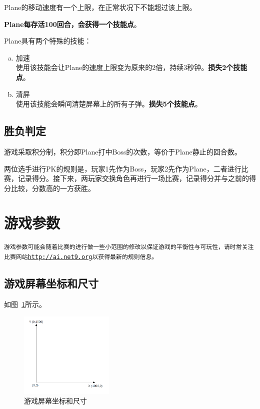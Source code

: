 \documentclass[11pt,a4paper]{article}
\begin{document}
Plane的移动速度有一个上限，在正常状况下不能超过该上限。

\textbf{Plane每存活100回合，会获得一个技能点}。

Plane具有两个特殊的技能：
\begin{enumerate}[(a)]
\item 加速\\
使用该技能会让Plane的速度上限变为原来的2倍，持续3秒钟。\textbf{损失2个技能点}。
\item 清屏\\
使用该技能会瞬间清楚屏幕上的所有子弹。\textbf{损失5个技能点}。
\end{enumerate}

\subsection{胜负判定}
游戏采取积分制，积分即Plane打中Boss的次数，等价于Plane静止的回合数。

两位选手进行PK的规则是，玩家1先作为Boss，玩家2先作为Plane，二者进行比赛，记录得分。接下来，两玩家交换角色再进行一场比赛，记录得分并与之前的得分比较，分数高的一方获胜。

\section{游戏参数}

\texttt{游戏参数可能会随着比赛的进行做一些小范围的修改以保证游戏的平衡性与可玩性，请时常关注比赛网站\url{http://ai.net9.org}以获得最新的规则信息。}

\subsection{游戏屏幕坐标和尺寸}
如图~\ref{fig:coor}所示。
\begin{figure}
\centering
\includegraphics[width=0.4\textwidth]{coor.png}
\caption{游戏屏幕坐标和尺寸}
\label{fig:coor}
\end{figure}
\end{document}
